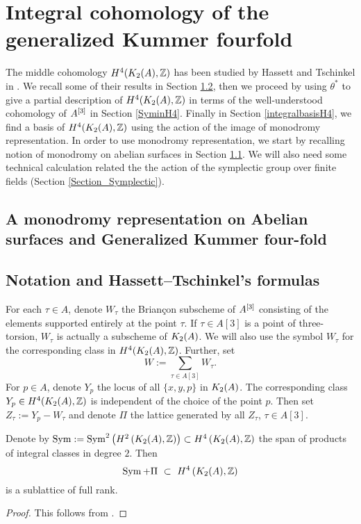 
 \section{Integral cohomology of the generalized Kummer fourfold}\label{Middle}
 
The middle cohomology $H^4(K_{ 2 }( A ),\mathbb{Z})$ has been studied by Hassett and Tschinkel in \cite{Hassett}. We recall some of their results in Section \ref{HassetTschinkelSection},
then we proceed by using $\theta^*$ to give a partial description of $H^4(K_{ 2 }( A ),\mathbb{Z})$ in terms of the well-understood cohomology of $A^{[3]}$ in Section \ref{SyminH4}. 
Finally in Section \ref{integralbasisH4}, we find a basis of $H^4(K_{ 2 }( A ),\mathbb{Z})$ using the action of the image of monodromy representation.
In order to use monodromy representation, we start by recalling notion of monodromy on abelian surfaces in Section \ref{monodromyexplication}. We will also need some technical calculation related the the action of the symplectic group over finite fields (Section \ref{Section_Symplectic}).
\subsection{A monodromy representation on Abelian surfaces and Generalized Kummer four-fold}\label{monodromyexplication}


\subsection{Notation and Hassett--Tschinkel's formulas}\label{HassetTschinkelSection}
\begin{notation}\label{TheZs}
For each $\tau \in A$, denote $W_\tau$ the Brian\c con subscheme of $A^{[3]}$ consisting of the elements supported entirely at the point $\tau$. If $\tau\in A[3]$ is a point of three-torsion, $W_\tau$ is actually a subscheme of $K_{ 2 }( A )$. We will also use the symbol $W_\tau$ for the corresponding class in $H^4(K_{ 2 }( A ),\mathbb{Z})$. Further, set 
$$
W := \sum_{\tau\in A[3]} W_\tau.
$$
For $p\in A$, denote $Y_p$ the locus of all $\{x,y,p\}$ in $K_{ 2 }( A )$. The corresponding class $Y_p \in H^4(K_{ 2 }( A ),\mathbb{Z})$ is independent of the choice of the point $p$. Then set $Z_\tau := Y_p - W_\tau$ and denote $\Pi$ the lattice generated by all $Z_\tau$, $\tau \in A[3]$.
\end{notation}
\begin{proposition}
Denote by $\operatorname{Sym} := \operatorname{Sym}^2\left(H^2\left(K_{ 2 }( A ),\mathbb{Z}\right)\right) \subset H^4\left(K_{ 2 }( A ),\mathbb{Z}\right) $ the span of products of integral classes in degree $2$.
Then 
$$
\Sym+\Pi \ \subset\  H^4\left(\X,\Z\right)
$$
is a sublattice  of full rank.  
\end{proposition}
\begin{proof}
This follows from \cite[Proposition 4.3]{Hassett}.
\end{proof}

